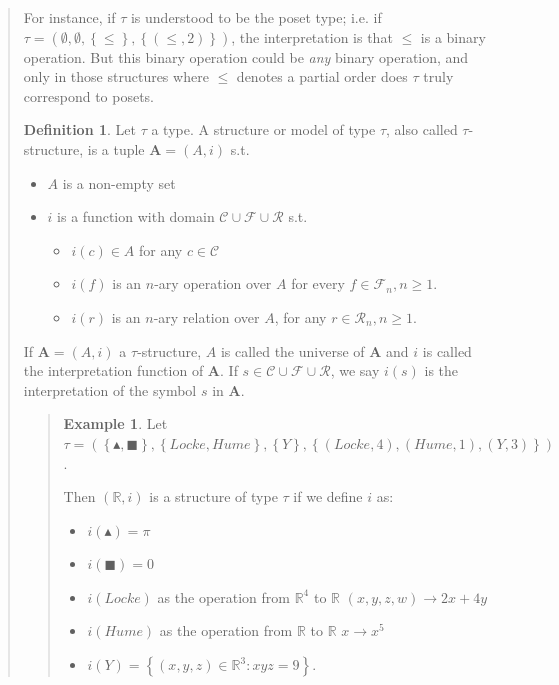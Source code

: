 \documentclass[a4paper, 12pt]{article}
\theoremstyle{definition}
\theoremstyle{definition}
\newtheorem{example}{Example}
\theoremstyle{definition}
\newtheorem{definition}{Definition}
\begin{document}
\begin{quote}
For instance, if $\tau$ is understood to be the poset type; i.e. if $\tau =
\left( \emptyset, \emptyset, \left\{ \leq \right\}, \left\{ (\leq, 2) \right\}
\right) $, the interpretation is that $\leq$ is a binary operation. But this
binary operation could be \textit{any} binary operation, and only 
in those structures where $\leq$ denotes a partial order does $\tau$
truly correspond to posets.

\begin{definition}
    Let $\tau$ a type. A structure or model of type $\tau$, also called 
    $\tau$-structure, is a tuple $\textbf{A} = (A, i)$ s.t.

    \begin{itemize}
        \item $A$ is a non-empty set 
        \item $i$ is a function with domain $\mathcal{C} \cup \mathcal{F} \cup \mathcal{R}$
            s.t. 
            \begin{itemize}
                \item $i(c) \in A$ for any $c \in \mathcal{C}$
                \item $i(f)$ is an $n$-ary operation over $A$ for every 
                    $f \in \mathcal{F}_n, n \geq 1$.
                \item $i(r)$ is an $n$-ary relation over $A$, for any 
                    $r \in \mathcal{R}_n, n \geq 1$.
            \end{itemize}
    \end{itemize}
\end{definition}

If $\textbf{A} = (A, i)$ a $\tau$-structure, $A$ is called the universe of
$\textbf{A}$ and $i$ is called the interpretation function of $\textbf{A}$.
If $s \in \mathcal{C} \cup \mathcal{F} \cup \mathcal{R}$, we say $i(s)$
is the interpretation of the symbol $s$ in $\textbf{A}$.


\small
\begin{quote}

\begin{example}
    Let $\tau = \left( \left\{ \blacktriangle, \blacksquare \right\}, \left\{
    Locke, Hume \right\}, \left\{ Y \right\}, \left\{ (Locke, 4), (Hume, 1),
(Y, 3) \right\}     \right) $.

Then $(\mathbb{R}, i)$ is a structure of type $\tau$ if we define $i$ as: 

\begin{itemize}
    \item $i(\blacktriangle) = \pi$
    \item $i(\blacksquare) = 0$
    \item $i(Locke)$ as the operation from $\mathbb{R}^4$ to $\mathbb{R}$ $(x, y, z, w) \to  2x + 4y$
    \item $i(Hume)$ as the operation from $\mathbb{R}$ to $\mathbb{R}$ $x \to x^5$
    \item $i(Y) = \left\{ (x, y, z) \in \mathbb{R}^3 : xyz = 9 \right\} $.
\end{itemize}
\end{example}


\end{quote}
\end{quote}
\end{document}
